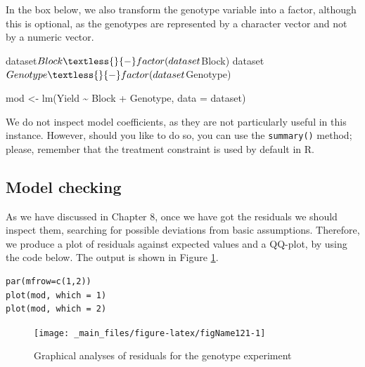 \documentclass[a4paper,12pt,oneside]{book}
\newenvironment{Shaded}{\begin{snugshade}}{\end{snugshade}}
\newcommand{\SpecialCharTok}[1]{#1}
\newcommand{\OtherTok}[1]{#1}
\newcommand{\FunctionTok}[1]{#1}
\newcommand{\AttributeTok}[1]{#1}
\newcommand{\NormalTok}[1]{#1}
\begin{document}
In the box below, we also transform the genotype variable into a factor, although this is optional, as the genotypes are represented by a character vector and not by a numeric vector.

\vspace{12pt}

\begin{Shaded}
\begin{Highlighting}[]
\NormalTok{dataset}\SpecialCharTok{$}\NormalTok{Block }\OtherTok{\textless{}{-}} \FunctionTok{factor}\NormalTok{(dataset}\SpecialCharTok{$}\NormalTok{Block)}
\NormalTok{dataset}\SpecialCharTok{$}\NormalTok{Genotype }\OtherTok{\textless{}{-}} \FunctionTok{factor}\NormalTok{(dataset}\SpecialCharTok{$}\NormalTok{Genotype)}

\NormalTok{mod }\OtherTok{\textless{}{-}} \FunctionTok{lm}\NormalTok{(Yield }\SpecialCharTok{\textasciitilde{}}\NormalTok{ Block }\SpecialCharTok{+}\NormalTok{ Genotype, }\AttributeTok{data =}\NormalTok{ dataset)}
\end{Highlighting}
\end{Shaded}

We do not inspect model coefficients, as they are not particularly useful in this instance. However, should you like to do so, you can use the \texttt{summary()} method; please, remember that the treatment constraint is used by default in R.

\hypertarget{model-checking}{%
\subsection{Model checking}\label{model-checking}}

As we have discussed in Chapter 8, once we have got the residuals we should inspect them, searching for possible deviations from basic assumptions. Therefore, we produce a plot of residuals against expected values and a QQ-plot, by using the code below. The output is shown in Figure \ref{fig:figName121}.

\vspace{12pt}

\begin{verbatim}
par(mfrow=c(1,2))
plot(mod, which = 1)
plot(mod, which = 2)
\end{verbatim}

\vspace{12pt}
\begin{figure}

{\centering \texttt{[image: \_main\_files/figure-latex/figName121-1]} 

}

\caption{Graphical analyses of residuals for the genotype experiment}\label{fig:figName121}
\end{figure}
\end{document}
